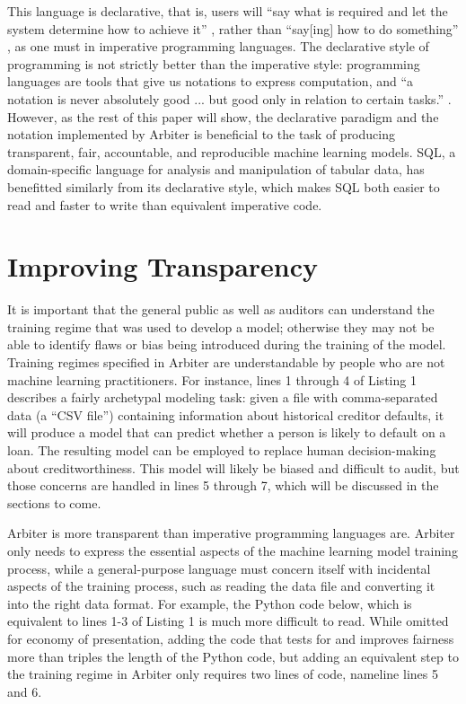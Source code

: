 \documentclass[letterpaper]{article}
\newcommand{\citep}[1]{\cite{#1}}
\begin{document}
This language is declarative, that is, users will ``say what is required and let the system determine how to achieve it'' \citep{Roy2004}, rather than ``say[ing] how to do something'' \citep{Roy2004}, as one must in imperative programming languages. The declarative style of programming is not strictly better than the imperative style: programming languages are tools that give us notations to express computation, and ``a notation is never absolutely good ... but good only in relation to certain tasks.'' \citep{Green1989}. However, as the rest of this paper will show, the declarative paradigm and the notation implemented by Arbiter is beneficial to the task of producing transparent, fair, accountable, and reproducible machine learning models. SQL, a domain-specific language for analysis and manipulation of tabular data, has benefitted similarly from its declarative style, which makes SQL both easier to read and faster to write than equivalent imperative code.

\section{Improving Transparency}	
It is important that the general public as well as auditors can understand the training regime that was used to develop a model; otherwise they may not be able to identify flaws or bias being introduced during the training of the model. Training regimes specified in Arbiter are understandable by people who are not machine learning practitioners. For instance, lines 1 through 4 of Listing 1 describes a fairly archetypal modeling task: given a file with comma-separated data (a ``CSV file'') containing information about historical creditor defaults, it will produce a model that can predict whether a person is likely to default on a loan. The resulting model can be employed to replace human decision-making about creditworthiness. This model will likely be biased and difficult to audit, but those concerns are handled in lines 5 through 7, which will be discussed in the sections to come.

Arbiter is more transparent than imperative programming languages are. Arbiter only needs to express the essential aspects of the machine learning model training process, while a general-purpose language must concern itself with incidental aspects of the training process, such as reading the data file and converting it into the right data format. For example, the Python code below, which is equivalent to lines 1-3 of Listing 1 is much more difficult to read. While omitted for economy of presentation, adding the code that tests for and improves fairness more than triples the length of the Python code, but adding an equivalent step to the training regime in Arbiter only requires two lines of code, nameline lines 5 and 6.
\end{document}
